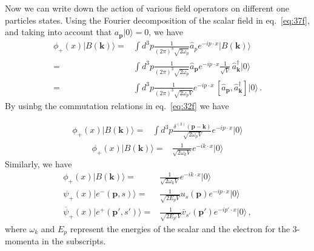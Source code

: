 Now we can write down the action of various field operators on different one particles states. 
Using the Fourier decomposition  of the scalar field in eq.~\eqref{eq:37f}, and taking into account that 
$a_{\mathbf{p}}|0\rangle=0$, we have
\begin{align}
\label{eq:98f}
   \phi_+(x)|B(\mathbf{k})\rangle=&\int d^3p \frac{1}{(2\pi)^3\sqrt{2\omega_{p} }}
\widehat{a}_{p} e^{-i p\cdot x }
|B(\mathbf{k})\rangle\nonumber\\
=&\int d^3p \frac{1}{(2\pi)^3\sqrt{2\omega_{p}}}
\widehat{a}_\mathbf{p} e^{-i p\cdot x }
\frac{1}{\sqrt{V}}\, \widehat{a}^\dagger_{\mathbf{k}}|0\rangle\nonumber\\
  =&\int d^3p \frac{1}{(2\pi)^3\sqrt{2\omega_{p}V}} e^{-i p\cdot x }
\, [\widehat{a}_{\mathbf{p}},\widehat{a}^\dagger_{\mathbf{k}}]|0\rangle\,.
\end{align}
By usinbg the commutation relations in eq.~\eqref{eq:32f} we have

\begin{align}
\phi_+(x)|B(\mathbf{k})\rangle  
=&\int d^3p \frac{\delta^{(3)}(\mathbf{p}-\mathbf{k})}{\sqrt{2\omega_{p}V}}
 e^{-i p\cdot x }|0\rangle
\end{align}
\begin{align}
\phi_+(x)|B(\mathbf{k})\rangle  
=&\frac{1}{\sqrt{2\omega_{k}V}}e^{-i k\cdot x }|0\rangle
\end{align}
Similarly, we have
\begin{align}
  \label{eq:99f}
  \phi_+(x)|B(\mathbf{k})\rangle=&\frac{1}{\sqrt{2 \omega_k V}}e^{-i k\cdot x}|0\rangle\nonumber\\
  \psi_+(x)|e^-(\mathbf{p},s)\rangle=&\frac{1}{\sqrt{2 E_p V}}u_s(\mathbf{p})e^{-i p\cdot x}|0\rangle\nonumber\\
  \overline{\psi}_+(x)|e^+(\mathbf{p}',s')\rangle=&\frac{1}{\sqrt{2 E_{p'} V}}\bar{v}_{s'}(\mathbf{p}')e^{-i p'\cdot x}|0\rangle\,,
\end{align}
where $\omega_k$ and $E_p$ represent the energies of the scalar and the electron for the 3-momenta in the subscripts.

